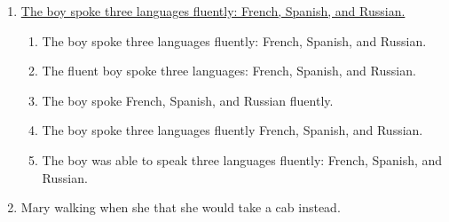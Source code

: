 \begin{enumerate}
\item \ul{The boy spoke three languages fluently: French, Spanish, and Russian.}

\begin{enumerate}[label=(\Alph*)]
\item The boy spoke three languages fluently: French, Spanish, and Russian. 
\item The fluent boy spoke three languages: French, Spanish, and Russian.
\item The boy spoke French, Spanish, and Russian fluently.
\item The boy spoke three languages fluently French, Spanish, and Russian. 
\item The boy was able to speak three languages fluently: French, Spanish, and Russian. 
\end{enumerate}

\item \begin{inparaenum}[A]
Mary  walking  when she  that she would  take a cab instead. 
\end{inparaenum}

\end{enumerate}